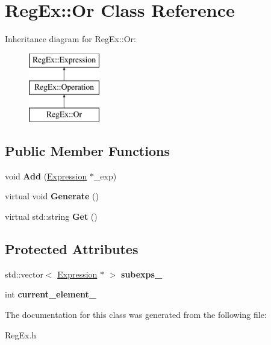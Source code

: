 \hypertarget{class_reg_ex_1_1_or}{}\section{Reg\+Ex\+:\+:Or Class Reference}
\label{class_reg_ex_1_1_or}
Inheritance diagram for Reg\+Ex\+:\+:Or\+:\begin{figure}[H]
\begin{center}
\leavevmode
\includegraphics[height=3.000000cm]{class_reg_ex_1_1_or}
\end{center}
\end{figure}
\subsection*{Public Member Functions}
\begin{DoxyCompactItemize}
\item 
\mbox{\label{class_reg_ex_1_1_or_a7254999b350c9f21636a10b1a4046832}} 
void {\bfseries Add} (\hyperlink{class_reg_ex_1_1_expression}{Expression} $\ast$\+\_\+exp)
\item 
\mbox{\label{class_reg_ex_1_1_or_a7b6fdaf356c6f252079c3472f9f63be6}} 
virtual void {\bfseries Generate} ()
\item 
\mbox{\label{class_reg_ex_1_1_or_a300c7c7959046826aa1e8f47f9e1a7c5}} 
virtual std\+::string {\bfseries Get} ()
\end{DoxyCompactItemize}
\subsection*{Protected Attributes}
\begin{DoxyCompactItemize}
\item 
\mbox{\label{class_reg_ex_1_1_or_a62c3a11f31f6af1cc6c86063e2756b41}} 
std\+::vector$<$ \hyperlink{class_reg_ex_1_1_expression}{Expression} $\ast$ $>$ {\bfseries subexps\+\_\+}
\item 
\mbox{\label{class_reg_ex_1_1_or_a3ad04a1b156a610397b97832724fb2e0}} 
int {\bfseries current\+\_\+element\+\_\+}
\end{DoxyCompactItemize}


The documentation for this class was generated from the following file\+:\begin{DoxyCompactItemize}
\item 
Reg\+Ex.\+h\end{DoxyCompactItemize}
